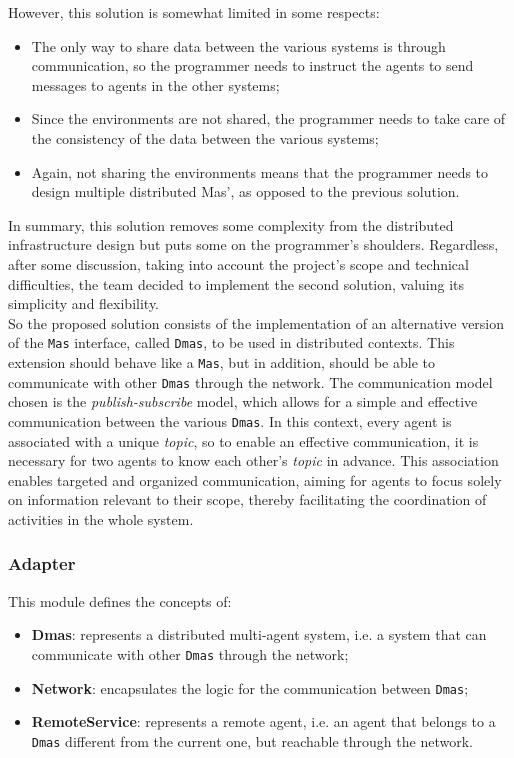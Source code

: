 However, this solution is somewhat limited in some respects:
\begin{itemize}
    \item The only way to share data between the various systems is through communication, so the programmer needs to instruct the agents to send messages to agents in the other systems;
    \item Since the environments are not shared, the programmer needs to take care of the consistency of the data between the various systems;
    \item Again, not sharing the environments means that the programmer needs to design multiple distributed Mas', as opposed to the previous solution.
\end{itemize}

In summary, this solution removes some complexity from the distributed infrastructure design but puts some on the programmer's shoulders.
Regardless, after some discussion, taking into account the project's scope and technical difficulties, the team decided to implement the second solution, valuing its simplicity and flexibility.\\

So the proposed solution consists of the implementation of an alternative version of the \texttt{Mas} interface, called \texttt{Dmas}, to be used in distributed contexts.
This extension should behave like a \texttt{Mas}, but in addition, should be able to communicate with other \texttt{Dmas} through the network.
The communication model chosen is the \textit{publish-subscribe} model, which allows for a simple and effective communication between the various \texttt{Dmas}.
In this context, every agent is associated with a unique \textit{topic}, so
to enable an effective communication, it is necessary for two agents to know each other's \textit{topic} in advance.
This association enables targeted and organized communication, aiming for agents to focus solely on information relevant to their scope,
thereby facilitating the coordination of activities in the whole system.

\subsubsection{Adapter}
This module defines the concepts of:

\begin{itemize}
    \item \textbf{Dmas}: represents a distributed multi-agent system, i.e. a system that can communicate with other \texttt{Dmas} through the network;
    \item \textbf{Network}: encapsulates the logic for the communication between \texttt{Dmas};
    \item \textbf{RemoteService}: represents a remote agent, i.e. an agent that belongs to a \texttt{Dmas} different from the current one, but reachable through the network.
\end{itemize}

